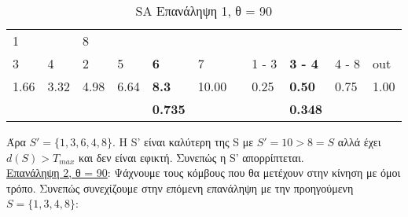 \documentclass[12pt, a4paper]{article}
\begin{document}
\begin{table}[H]
\centering
\begin{tabular}{lllllllllll}
\multicolumn{1}{|l}{1}     & \multicolumn{1}{l|}{\textbf{}} & 8                         &                           &                                   &      &                       &                            &                                     &                            &      \\
\multicolumn{1}{|l|}{3}    & \multicolumn{1}{l|}{4}         & \multicolumn{1}{l|}{2}    & \multicolumn{1}{l|}{5}    & \multicolumn{1}{l|}{\textbf{6}}   & 7    & \multicolumn{1}{l|}{} & \multicolumn{1}{l|}{1 - 3} & \multicolumn{1}{l|}{\textbf{3 - 4}} & \multicolumn{1}{l|}{4 - 8} & out  \\ \cline{1-6} \cline{8-11} 
\multicolumn{1}{|l|}{1.66} & \multicolumn{1}{l|}{3.32}      & \multicolumn{1}{l|}{4.98} & \multicolumn{1}{l|}{6.64} & \multicolumn{1}{l|}{\textbf{8.3}} & 10.00 & \multicolumn{1}{l|}{} & \multicolumn{1}{l|}{0.25}  & \multicolumn{1}{l|}{\textbf{0.50}}  & \multicolumn{1}{l|}{0.75}  & 1.00 \\
                           &                                &                           &                           & \textbf{0.735}                    &      &                       &                            & \textbf{0.348}                      &                            &     
\end{tabular}
\caption{SA Επανάληψη 1, θ = 90}
\label{my-label}
\end{table}

Άρα \(S'=\{1,3,6,4,8\}\). Η S' είναι καλύτερη της S με \(S'=10>8=S\) αλλά έχει \(d(S) > T_{max}\) και δεν είναι εφικτή. Συνεπώς η S'  απορρίπτεται. \\


\underline{Επανάληψη 2, θ = 90}: Ψάχνουμε τους κόμβους που θα μετέχουν στην κίνηση με όμοι τρόπο. Συνεπώς συνεχίζουμε στην επόμενη επανάληψη με την προηγούμενη \(S = \{1,3,4,8\}\):
\end{document}
